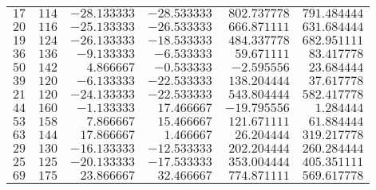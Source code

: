 \begin{tabular}{rrrrrr}
$17$    & $114$           & $-28.133333$  & $-28.533333$  & $802.737778$  & $791.484444$   \\[4pt]
$20$    & $116$           & $-25.133333$  & $-26.533333$  & $666.871111$  & $631.684444$   \\[4pt]
$19$    & $124$           & $-26.133333$  & $-18.533333$  & $484.337778$  & $682.951111$   \\[4pt]
$36$    & $136$           & $-9.133333$   & $-6.533333$   & $59.671111$   & $83.417778$    \\[4pt]
$50$    & $142$           & $4.866667$    & $-0.533333$   & $-2.595556$   & $23.684444$    \\[4pt]
$39$    & $120$           & $-6.133333$   & $-22.533333$  & $138.204444$  & $37.617778$    \\[4pt]
$21$    & $120$           & $-24.133333$  & $-22.533333$  & $543.804444$  & $582.417778$   \\[4pt]
$44$    & $160$           & $-1.133333$   & $17.466667$   & $-19.795556$  & $1.284444$     \\[4pt]
$53$    & $158$           & $7.866667$    & $15.466667$   & $121.671111$  & $61.884444$    \\[4pt]
$63$    & $144$           & $17.866667$   & $1.466667$    & $26.204444$   & $319.217778$   \\[4pt]
$29$    & $130$           & $-16.133333$  & $-12.533333$  & $202.204444$  & $260.284444$   \\[4pt]
$25$    & $125$           & $-20.133333$  & $-17.533333$  & $353.004444$  & $405.351111$   \\[4pt]
$69$    & $175$           & $23.866667$   & $32.466667$   & $774.871111$  & $569.617778$   \\\bottomrule
\end{tabular}
